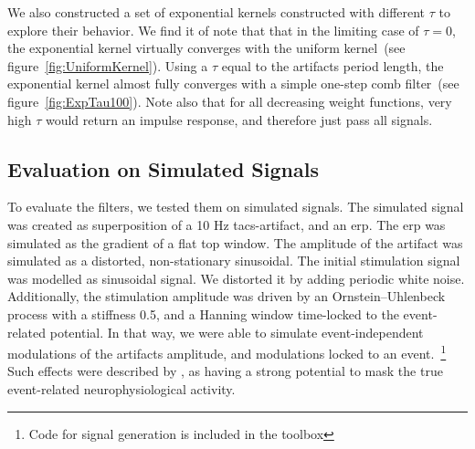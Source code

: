 \documentclass[a4paper]{article}
\newcommand{\figref}[1]{(see figure~\ref{#1})}
\begin{document}
We also constructed a set of exponential kernels constructed with different $\tau$ to explore their behavior.
We find it of note that that in the limiting case of $\tau = 0$, the exponential kernel virtually converges with the uniform kernel~\figref{fig:UniformKernel}. Using a $\tau$ equal to the artifacts period length, the exponential kernel almost fully converges with a simple one-step comb filter~\figref{fig:ExpTau100}.
Note also that for all decreasing weight functions, very high $\tau$ would return an impulse response, and therefore just pass all signals.

\subsection{Evaluation on Simulated Signals}\label{sec:EvaluationSimulated}

To evaluate the filters, we tested them on simulated signals. The simulated signal was created as superposition of a 10 Hz \gls{tacs}-artifact, and an \gls{erp}.
The \gls{erp} was simulated as the gradient of a flat top window. The amplitude of the artifact was simulated as a distorted, non-stationary sinusoidal.
The initial stimulation signal was modelled as sinusoidal signal. We distorted it by adding periodic white noise. Additionally, the stimulation amplitude was driven by an Ornstein–Uhlenbeck process with a stiffness 0.5, and a Hanning window time-locked to the event-related potential.
In that way, we were able to simulate event-independent modulations of the artifacts amplitude, and modulations locked to an event.~\footnote{Code for signal generation is included in the toolbox}
Such effects were described by \citep{Noury_2016}, as having a strong potential to mask the true event-related neurophysiological activity.
\end{document}
